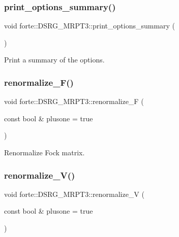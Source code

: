 \subsubsection{\texorpdfstring{print\+\_\+options\+\_\+summary()}{print\_options\_summary()}}
{\footnotesize\ttfamily void forte\+::\+D\+S\+R\+G\+\_\+\+M\+R\+P\+T3\+::print\+\_\+options\+\_\+summary (\begin{DoxyParamCaption}{ }\end{DoxyParamCaption})\hspace{0.3cm}{\ttfamily [protected]}}



Print a summary of the options. 

\mbox{\label{classforte_1_1_d_s_r_g___m_r_p_t3_a592593cdbd5cbf0024bc5f9520b4a88d}} 
\subsubsection{\texorpdfstring{renormalize\+\_\+\+F()}{renormalize\_F()}}
{\footnotesize\ttfamily void forte\+::\+D\+S\+R\+G\+\_\+\+M\+R\+P\+T3\+::renormalize\+\_\+F (\begin{DoxyParamCaption}\item[{const bool \&}]{plusone = {\ttfamily true} }\end{DoxyParamCaption})\hspace{0.3cm}{\ttfamily [protected]}}



Renormalize Fock matrix. 

\mbox{\label{classforte_1_1_d_s_r_g___m_r_p_t3_aaf25a724d9aeeafb121d56abd71f0748}} 
\subsubsection{\texorpdfstring{renormalize\+\_\+\+V()}{renormalize\_V()}}
{\footnotesize\ttfamily void forte\+::\+D\+S\+R\+G\+\_\+\+M\+R\+P\+T3\+::renormalize\+\_\+V (\begin{DoxyParamCaption}\item[{const bool \&}]{plusone = {\ttfamily true} }\end{DoxyParamCaption})\hspace{0.3cm}{\ttfamily [protected]}}



